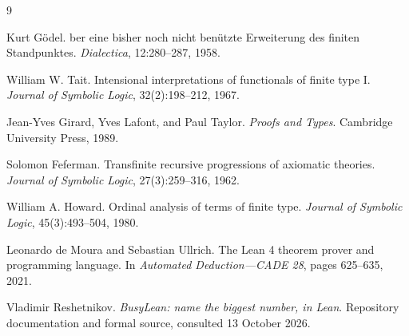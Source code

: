 \documentclass[11pt]{article}
\theoremstyle{definition}
\begin{document}
\begin{thebibliography}{9}

Kurt G\"odel.
ber eine bisher noch nicht ben\"utzte Erweiterung des finiten
Standpunktes.
\newblock \emph{Dialectica}, 12:280--287, 1958.

William W. Tait.
\newblock Intensional interpretations of functionals of finite type I.
\newblock \emph{Journal of Symbolic Logic}, 32(2):198--212, 1967.

Jean-Yves Girard, Yves Lafont, and Paul Taylor.
\newblock \emph{Proofs and Types}.
\newblock Cambridge University Press, 1989.

Solomon Feferman.
\newblock Transfinite recursive progressions of axiomatic theories.
\newblock \emph{Journal of Symbolic Logic}, 27(3):259--316, 1962.

William A. Howard.
\newblock Ordinal analysis of terms of finite type.
\newblock \emph{Journal of Symbolic Logic}, 45(3):493--504, 1980.

Leonardo de Moura and Sebastian Ullrich.
\newblock The Lean 4 theorem prover and programming language.
\newblock In \emph{Automated Deduction---CADE 28}, pages 625--635, 2021.

Vladimir Reshetnikov.
\newblock \emph{BusyLean: name the biggest number, in Lean}.
\newblock Repository documentation and formal source, consulted 13 October
2026.

\end{thebibliography}
\end{document}
